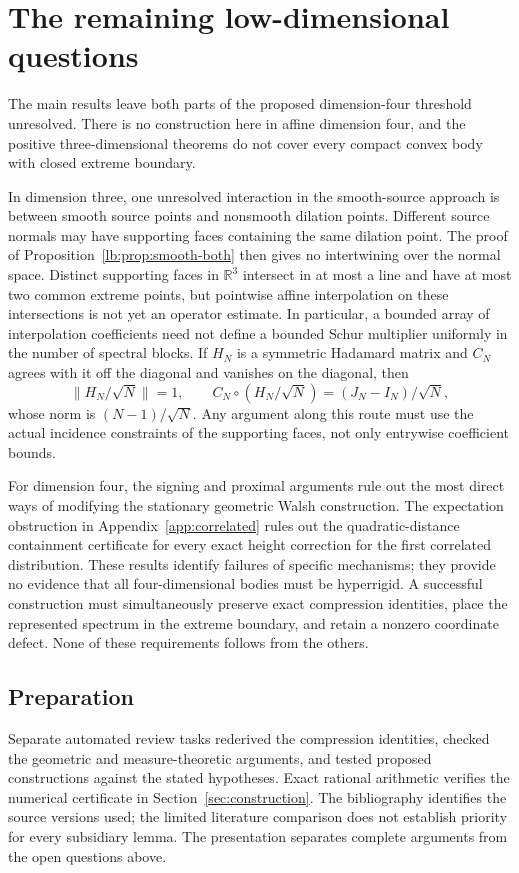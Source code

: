 \documentclass[11pt,letterpaper]{amsart}
\theoremstyle{definition}
\theoremstyle{remark}
\numberwithin{equation}{section}
\newcommand{\R}{\mathbb R}
\begin{document}
\section{The remaining low-dimensional questions}
\label{sec:questions}

The main results leave both parts of the proposed dimension-four
threshold unresolved. There is no construction here in affine
dimension four, and the positive three-dimensional theorems do not
cover every compact convex body with closed extreme boundary.

In dimension three, one unresolved interaction in the smooth-source
approach is between smooth source points and nonsmooth dilation
points. Different source normals may have supporting faces containing
the same dilation point.
The proof of Proposition~\ref{lb:prop:smooth-both} then gives no
intertwining over the normal space. Distinct supporting faces in
$\R^3$ intersect in at most a line and have at most two common extreme points,
but pointwise affine interpolation on these intersections is not yet
an operator estimate. In particular, a bounded array of interpolation
coefficients need not define a bounded Schur multiplier uniformly in
the number of spectral blocks. If $H_N$ is a symmetric Hadamard matrix
and $C_N$ agrees with it off the diagonal and vanishes on the diagonal,
then
\[
 \|H_N/\sqrt N\|=1,
 \qquad C_N\circ(H_N/\sqrt N)=(J_N-I_N)/\sqrt N,
\]
whose norm is $(N-1)/\sqrt N$. Any argument along this route must
use the actual incidence constraints of the supporting faces, not
only entrywise coefficient bounds.

For dimension four, the signing and proximal arguments rule out the
most direct ways of modifying the stationary geometric Walsh
construction. The expectation obstruction in
Appendix~\ref{app:correlated} rules out the quadratic-distance
containment certificate for every exact height correction for the
first correlated distribution. These results identify failures
of specific mechanisms; they provide no evidence that all
four-dimensional bodies must be hyperrigid. A successful construction
must simultaneously preserve exact compression identities, place the
represented spectrum in the extreme boundary, and retain a nonzero
coordinate defect. None of these requirements follows from the others.

\subsection*{Preparation}
Separate automated review tasks rederived the compression
identities, checked the geometric and measure-theoretic arguments,
and tested proposed constructions against the stated hypotheses.
Exact rational arithmetic verifies the numerical certificate in
Section~\ref{sec:construction}.
The bibliography identifies the source versions used; the limited
literature comparison does not establish priority for every subsidiary
lemma. The presentation separates complete arguments from the open
questions above.
\end{document}
